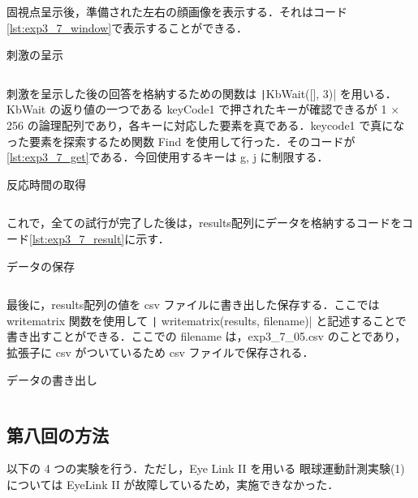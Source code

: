 \documentclass[dvipdfmx, titlepage, t]{jsarticle}
\begin{document}
    固視点呈示後，準備された左右の顔画像を表示する．それはコード\ref{lst:exp3_7_window}で表示することができる．
    \begin{program}[H]
        \caption{刺激の呈示}
        \inputminted[linenos, 
        firstline=95,
        lastline=99,
        frame=lines,
        fontsize=\small]{matlab}{code/Exp3_7_Matlab.m}
        \label{lst:exp3_7_window}
    \end{program}

    刺激を呈示した後の回答を格納するための関数は \texttt|KbWait([], 3)| を用いる．KbWait の返り値の一つである keyCode1 で押されたキーが確認できるが 1 $\times$ 256 の論理配列であり，各キーに対応した要素を真である．keycode1 で真になった要素を探索するため関数 Find を使用して行った．そのコードが\ref{lst:exp3_7_get}である．今回使用するキーは g, j に制限する． 

    \begin{program}[H]
        \caption{反応時間の取得}
        \inputminted[linenos,
            firstline=102,
            lastline=107,
            frame=lines,
            fontsize = \small
        ]{matlab}{code/Exp3_7_Matlab.m}
        \label{lst:exp3_7_get}
    \end{program}

    これで，全ての試行が完了した後は，results配列にデータを格納するコードをコード\ref{lst:exp3_7_result}に示す．

    \begin{program}[H]
        \caption{データの保存}
        \inputminted[linenos,
        firstline=106,
        lastline=111,
        frame=lines,
        fontsize = \small]{matlab}{code/Exp3_7_Matlab.m}
        \label{lst:exp3_7_result}
    \end{program}

    最後に，results配列の値を csv ファイルに書き出した保存する．ここでは writematrix 関数を使用して \texttt| writematrix(results, filename)| と記述することで書き出すことができる．ここでの filename は，exp3\_7\_05.csv のことであり，拡張子に csv がついているため csv ファイルで保存される．
        \begin{program}[H]
        \caption{データの書き出し}
        \inputminted[linenos,
        firstline=129,
        lastline=132,
        frame=lines,
        fontsize = \small]{matlab}{code/Exp3_7_Matlab.m}
        \label{lst:exp3_7_write}
    \end{program}




    \subsection{第八回の方法}
    以下の 4 つの実験を行う．ただし，Eye Link II を用いる 眼球運動計測実験(1)については EyeLink II  が故障しているため，実施できなかった．
\end{document}
